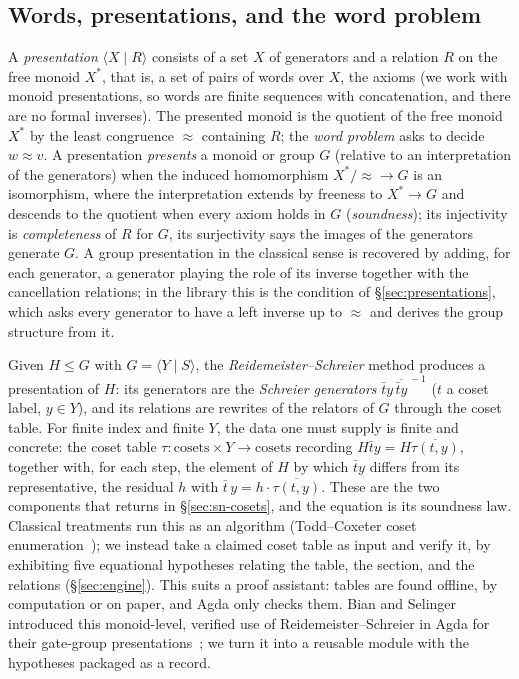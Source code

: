 \subsection{Words, presentations, and the word problem}\label{sec:wordproblem}

A \emph{presentation} $\langle X \mid R \rangle$ consists of a set $X$ of
generators and a relation $R$ on the free monoid $X^{*}$, that is, a set of
pairs of words over $X$, the axioms (we work with monoid
presentations, so words are finite sequences with concatenation, and there
are no formal inverses).  The presented monoid is the quotient of the free
monoid $X^{*}$ by the least congruence $\approx$ containing $R$; the
\emph{word problem} asks to decide $w \approx v$.  A presentation
\emph{presents} a monoid or group $G$ (relative to an interpretation of
the generators) when the induced homomorphism $X^{*}/{\approx} \to G$ is
an isomorphism, where the interpretation extends by freeness to
$X^{*} \to G$ and descends to the quotient when every axiom holds in $G$
(\emph{soundness}); its injectivity is \emph{completeness} of
$R$ for $G$, its surjectivity says the images of the generators
generate $G$.  A group presentation in the
classical sense is recovered by adding, for each generator, a generator
playing the role of its inverse together with the cancellation relations;
in the library this is the  condition of
\S\ref{sec:presentations}, which asks every generator to have a left
inverse up to $\approx$ and derives the group structure from it.

Given $H \le G$ with $G = \langle Y \mid S \rangle$, the
\emph{Reidemeister--Schreier} method produces a presentation of $H$: its
generators are the \emph{Schreier generators} $\bar t y\,\overline{\bar t y}^{\,-1}$
($t$ a coset label, $y \in Y$), and its relations are rewrites of the
relators of $G$ through the coset table.  For finite index and finite $Y$,
the data one must supply is finite and concrete: the coset table
$\tau : \text{cosets} \times Y \to \text{cosets}$ recording
$H\bar t y = H\overline{\tau(t,y)}$,
together with, for each step, the element of $H$ by which $\bar t y$ differs from
its representative, the residual $h$ with $\bar t\, y = h
\cdot \overline{\tau(t,y)}$.  These are the two components that
 returns in \S\ref{sec:sn-cosets}, and the equation is its
soundness law.  Classical treatments run this as an algorithm
(Todd--Coxeter coset enumeration~\cite{sims1994computation,
holt2005handbook}); we instead take a claimed coset table
as input and verify it, by exhibiting five equational
hypotheses relating the table, the section, and the relations
(\S\ref{sec:engine}).  This suits a proof assistant: tables are found
offline, by computation or on paper, and Agda only checks them.
Bian and Selinger introduced this monoid-level, verified use of
Reidemeister--Schreier in Agda for their gate-group
presentations~\cite{bian2023cliffordt2,bian2023cliffordcs3,bian2023thesis};
we turn it into a reusable module with the hypotheses packaged as
a record.

